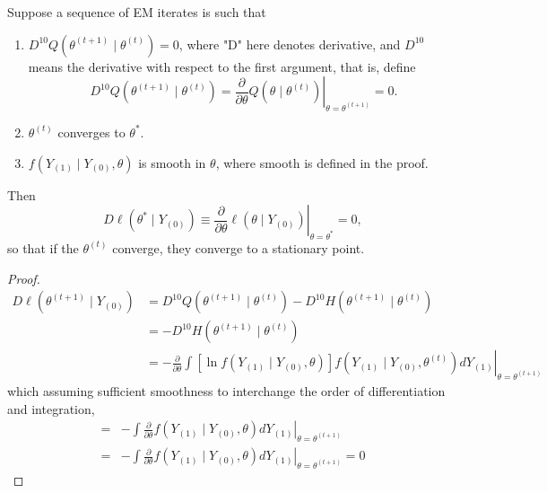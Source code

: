 \begin{theorem}
	Suppose a sequence of EM iterates is such that
	\begin{enumerate}
		\item $D^{10} Q\left(\theta^{(t+1)} \mid \theta^{(t)}\right)=0$, where "D" here denotes derivative, and $D^{10}$ means the derivative with respect to the first argument, that is, define
		      \begin{equation}
			      D^{10} Q\left(\theta^{(t+1)}\mid\theta^{(t)}\right)=\left.\frac{\partial}{\partial \theta} Q\left(\theta \mid \theta^{(t)}\right)\right|_{\theta=\theta^{(t+1)}}=0.
		      \end{equation}
		\item $\theta^{(t)}$ converges to $\theta^{*}$.
		\item $f\left(Y_{(1)} \mid Y_{(0)}, \theta\right)$ is smooth in $\theta$, where smooth is defined in the proof.
	\end{enumerate}
	Then
	\begin{equation}
		\left.D \ell\left(\theta^{*} \mid Y_{(0)}\right) \equiv \frac{\partial}{\partial \theta} \ell\left(\theta \mid Y_{(0)}\right)\right|_{\theta=\theta^{*}}=0,
	\end{equation}
	so that if the $\theta^{(t)}$ converge, they converge to a stationary point.
\end{theorem}

\begin{proof}
	\begin{equation}
		\begin{aligned}
			D \ell\left(\theta^{(t+1)} \mid Y_{(0)}\right) & =D^{10} Q\left(\theta^{(t+1)} \mid \theta^{(t)}\right)-D^{10} H\left(\theta^{(t+1)} \mid \theta^{(t)}\right)                                                                                       \\
			                                               & =-D^{10} H\left(\theta^{(t+1)} \mid \theta^{(t)}\right)                                                                                                                                            \\
			                                               & =-\left.\frac{\partial}{\partial \theta} \int\left[\ln f\left(Y_{(1)} \mid Y_{(0)}, \theta\right)\right] f\left(Y_{(1)} \mid Y_{(0)}, \theta^{(t)}\right) d Y_{(1)}\right|_{\theta=\theta^{(t+1)}}
		\end{aligned}
	\end{equation}
	which assuming sufficient smoothness to interchange the order of differentiation and integration,
	\begin{equation}
		\begin{aligned}
			= & -\int\left.\frac{\partial}{\partial \theta} f\left(Y_{(1)} \mid Y_{(0)}, \theta\right) d Y_{(1)}\right|_{\theta=\theta^{(t+1)}}    \\
			= & -\left.\int \frac{\partial}{\partial \theta} f\left(Y_{(1)} \mid Y_{(0)}, \theta\right) d Y_{(1)}\right|_{\theta=\theta^{(t+1)}}=0
		\end{aligned}
	\end{equation}
\end{proof}

